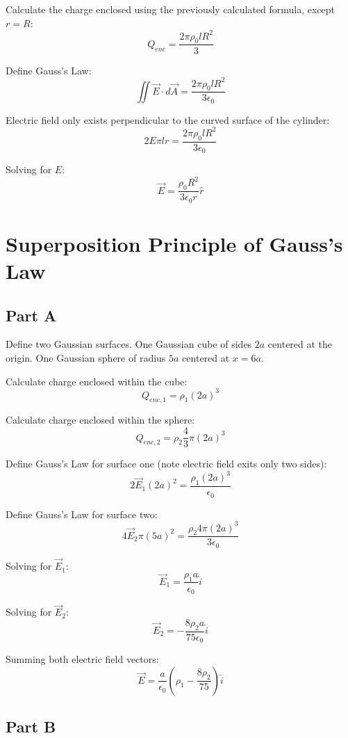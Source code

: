 \documentclass{article}
\begin{document}
\bigbreak

Calculate the charge enclosed using the previously calculated formula, except
$r = R$:
$$ Q_{enc} = \frac{ 2 \pi \rho_{0} l R^{2}}{ 3 }$$

Define Gauss's Law:
$$ \iint \vec{E} \cdot d\vec{A} = \frac{ 2 \pi \rho_{0} l R^{2}}{ 3 \epsilon_{0}
}$$

Electric field only exists perpendicular to the curved surface of the cylinder:
$$ 2 E \pi l r = \frac{ 2 \pi \rho_{0} l R^{2}}{ 3 \epsilon_{0} } $$

Solving for $E$:
$$ \vec{E} = \frac{ \rho_{0} R^{2} }{ 3 \epsilon_{0} r } \hat{r} $$

\section{Superposition Principle of Gauss's Law}

\subsection*{Part A}

Define two Gaussian surfaces. One Gaussian cube of sides $2a$ centered at the
origin. One Gaussian sphere of radius $5a$ centered at $x = 6a$.

\bigbreak

Calculate charge enclosed within the cube:
$$ Q_{enc, 1} = \rho_{1} (2a)^{3} $$

Calculate charge enclosed within the sphere:
$$ Q_{enc, 2} = \rho_{2} \frac{ 4 }{ 3 } \pi (2a)^{3} $$

Define Gauss's Law for surface one (note electric field exits only two sides):
$$ 2 \vec{E}_{1} (2a)^{2} = \frac{ \rho_{1} (2a)^{3}}{\epsilon_0} $$

Define Gauss's Law for surface two:
$$ 4 \vec{E}_{2} \pi (5a)^{2} = \frac{ \rho_{2} 4 \pi (2a)^{3} }{3 \epsilon_0}
$$

Solving for $\vec{E}_{1}$:
$$ \vec{E}_{1} = \frac{ \rho_{1} a }{ \epsilon_0 } \hat{i}$$

Solving for $\vec{E}_{2}$:
$$ \vec{E}_{2} = -\frac{ 8 \rho_{2} a }{ 75 \epsilon_0 } \hat{i} $$

Summing both electric field vectors:
$$ \vec{E} = \frac{ a }{ \epsilon_0 }\left( \rho_{1} - \frac{ 8 \rho_{2} }{ 75 }
\right) \hat{i} $$

\subsection*{Part B}
\end{document}

